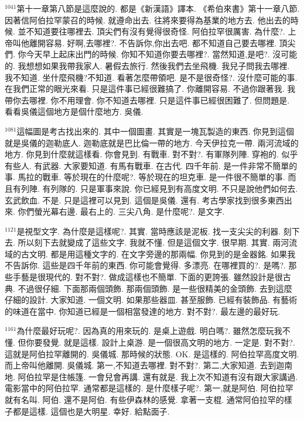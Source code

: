 \documentclass{book}
\begin{document}
$^{1041}$第十一章第八節是這麼說的.
都是《新漢語》譯本.
《希伯來書》第十一章八節.
因著信阿伯拉罕蒙召的時候.
就遵命出去.
往將來要得為基業的地方去.
他出去的時候.
並不知道要往哪裡去.
頂尖們有沒有覺得很奇怪.
阿伯拉罕很厲害.
為什麼?.
上帝叫他離開容易.
好啊,去哪裡?.
不告訴你,你出去吧.
都不知道自己要去哪裡.
頂尖們.
你今天早上起床出門的時候.
你知不知道你要去哪裡?.
當然知道,是吧?.
沒可能的.
我想想如果我帶我家人.
暑假去旅行.
然後我們去坐飛機.
我兒子問我去哪裡.
我不知道.
坐什麼飛機?不知道.
看著怎麼帶領吧.
是不是很奇怪?.
沒什麼可能的事.
在我們正常的眼光來看.
只是這件事已經很難搞了.
你離開容易.
不過你跟著我.
我帶你去哪裡.
你不用理會.
你不知道去哪裡.
只是這件事已經很困難了.
但問題是.
看看吳儀這個地方是個什麼地方.
吳儀.

$^{1081}$這幅圖是考古找出來的.
其中一個圖畫.
其實是一塊瓦製造的東西.
你見到這個就是吳儀的迦勒底人.
迦勒底就是巴比倫一帶的地方.
今天伊拉克一帶.
兩河流域的地方.
你見到什麼就這樣看.
你會見到.
有戰車.
對不對?.
有軍隊列陣.
穿袍的.
似乎有些人.
有武器.
大家要知道.
有馬有戰車.
在古代.
四千年前.
是一件非常不簡單的事.
馬拉的戰車.
等於現在的什麼呢?.
等於現在的坦克車.
是一件很不簡單的事.
而且有列陣.
有列隊的.
只是軍事來說.
你已經見到有高度文明.
不只是說他們如何去.
玄武飲血.
不是.
只是這裡可以見到.
這個是吳儀.
還有.
考古學家找到很多東西出來.
你們螢光幕右邊.
最右上的.
三尖八角.
是什麼呢?.
是文字.

$^{1121}$是視型文字.
為什麼是這樣呢?.
其實.
當時應該是泥板.
找一支尖尖的利器.
刻下去.
所以刻下去就變成了這些文字.
我就不懂.
但是這個文字.
很早期.
其實.
兩河流域的古文明.
都是用這種文字的.
在文字旁邊的那兩幅.
你見到的是金器銘.
如果我不告訴你.
這些是四千年前的東西.
你可能會覺得.
多漂亮.
在哪裡買的?.
是嗎?.
那些手藝是很現代的.
對不對?.
做成這樣也不簡單.
下面的更誇張.
雖然設計是很古典.
不過很仔細.
下面那兩個頭飾.
那兩個頭飾.
是一些很精美的金頭飾.
去到這麼仔細的設計.
大家知道.
一個文明.
如果那些器皿.
甚至服飾.
已經有裝飾品.
有藝術的味道在當中.
你知道已經是一個相當發達的地方.
對不對?.
最左邊的最好玩.

$^{1161}$為什麼最好玩呢?.
因為真的用來玩的.
是桌上遊戲.
明白嗎?.
雖然怎麼玩我不懂.
但你要發覺.
就是這樣.
設計上桌游.
是一個很高文明的地方.
一定是.
對不對?.
這就是阿伯拉罕離開的.
吳儀城.
那時候的狀態.
OK.
是這樣的.
阿伯拉罕高度文明.
而上帝叫他離開.
吳儀城.
第一,不知道去哪裡.
對不對?.
第二,大家知道.
去到迦南地.
阿伯拉罕是住帳篷.
一會兒會再講.
還有就是.
我上次不知道有沒有跟大家講過.
電影當中的阿伯拉罕.
通常都是這樣的.
是什麼樣子呢?.
第一,就是阿伯.
阿伯拉罕就有名叫.
阿伯.
還不是阿伯.
有些伊森林的感覺.
拿著一支棍.
通常阿伯拉罕的樣子都是這樣.
這個也是大明星.
幸好.
給點面子.
\end{document}
